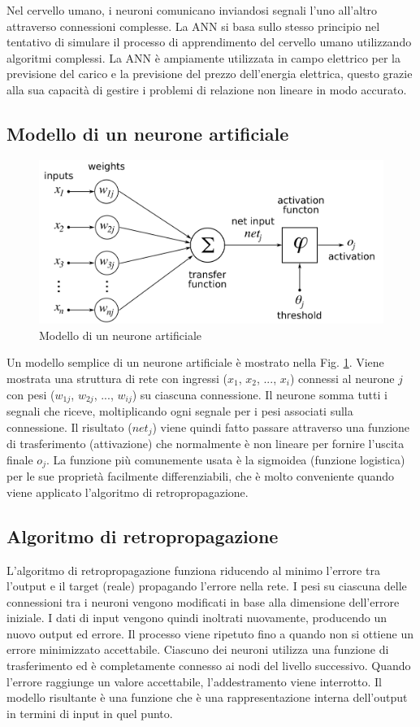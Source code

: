 \documentclass[italian, Lau, oneside]{sapthesis}
\begin{document}
Nel cervello umano, i neuroni comunicano inviandosi segnali l'uno all'altro attraverso connessioni complesse. La ANN si basa sullo stesso principio nel tentativo di simulare il processo di apprendimento del cervello umano utilizzando algoritmi complessi. La ANN è ampiamente utilizzata in campo elettrico per la previsione del carico e la previsione del prezzo dell'energia elettrica, questo grazie alla sua capacità di gestire i problemi di relazione non lineare in modo accurato.

\subsection{Modello di un neurone artificiale}
\begin{figure}[h]
    \centering
    \includegraphics[width=\textwidth]{neurone.png}
    \caption{Modello di un neurone artificiale}
    \label{fig:neurone}
\end{figure}
Un modello semplice di un neurone artificiale è mostrato nella Fig. \ref{fig:neurone}. Viene mostrata una struttura di rete con ingressi ($x_1$, $x_2$, ..., $x_i$) connessi al neurone $j$ con pesi ($w_{1j}$, $w_{2j}$, ..., $w_{ij}$) su ciascuna connessione. Il neurone somma tutti i segnali che riceve, moltiplicando ogni segnale per i pesi associati sulla connessione. Il risultato ($net_j$) viene quindi fatto passare attraverso una funzione di trasferimento (attivazione) che normalmente è non lineare per fornire l'uscita finale $o_j$. La funzione più comunemente usata è la sigmoidea (funzione logistica) per le sue proprietà facilmente differenziabili, che è molto conveniente quando viene applicato l'algoritmo di retropropagazione. 

\subsection{Algoritmo di retropropagazione}
L'algoritmo di retropropagazione funziona riducendo al minimo l'errore tra l'output e il target (reale) propagando l'errore nella rete. I pesi su ciascuna delle connessioni tra i neuroni vengono modificati in base alla dimensione dell'errore iniziale. I dati di input vengono quindi inoltrati nuovamente, producendo un nuovo output ed errore. Il processo viene ripetuto fino a quando non si ottiene un errore minimizzato accettabile. Ciascuno dei neuroni utilizza una funzione di trasferimento ed è completamente connesso ai nodi del livello successivo. Quando l'errore raggiunge un valore accettabile, l'addestramento viene interrotto. Il modello risultante è una funzione che è una rappresentazione interna dell'output in termini di input in quel punto.
\end{document}
